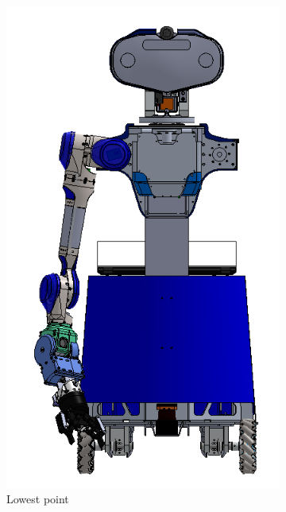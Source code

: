 \documentclass[runningheads,a4paper]{llncs}
\begin{document}
\begin{figure}[h!]
  \centering
  \begin{subfigure}[b]{0.2\linewidth}
    \includegraphics[width=\linewidth]{images/robot_low.PNG}
    \caption{Lowest point}
  \end{subfigure}
  \begin{subfigure}[b]{0.2\linewidth}

\end{subfigure}
\end{figure}
\end{document}
